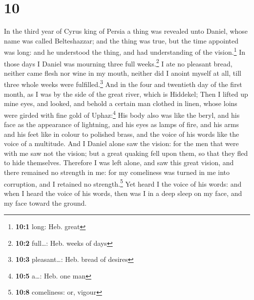 \hypertarget{section-9}{%
\section{10}\label{section-9}}

 In the third year of Cyrus king of Persia a thing was
revealed unto Daniel, whose name was called Belteshazzar; and the thing
was true, but the time appointed was long: and he understood the thing,
and had understanding of the vision.\footnote{\textbf{10:1} long: Heb.
  great}  In those days I Daniel was mourning three full
weeks.\footnote{\textbf{10:2} full\ldots: Heb. weeks of days}
 I ate no pleasant bread, neither came flesh nor wine in
my mouth, neither did I anoint myself at all, till three whole weeks
were fulfilled.\footnote{\textbf{10:3} pleasant\ldots: Heb. bread of
  desires}  And in the four and twentieth day of the first
month, as I was by the side of the great river, which is Hiddekel;
 Then I lifted up mine eyes, and looked, and behold a
certain man clothed in linen, whose loins were girded with fine gold of
Uphaz:\footnote{\textbf{10:5} a\ldots: Heb. one man}  His
body also was like the beryl, and his face as the appearance of
lightning, and his eyes as lamps of fire, and his arms and his feet like
in colour to polished brass, and the voice of his words like the voice
of a multitude.  And I Daniel alone saw the vision: for
the men that were with me saw not the vision; but a great quaking fell
upon them, so that they fled to hide themselves. 
Therefore I was left alone, and saw this great vision, and there
remained no strength in me: for my comeliness was turned in me into
corruption, and I retained no strength.\footnote{\textbf{10:8}
  comeliness: or, vigour}  Yet heard I the voice of his
words: and when I heard the voice of his words, then was I in a deep
sleep on my face, and my face toward the ground.

